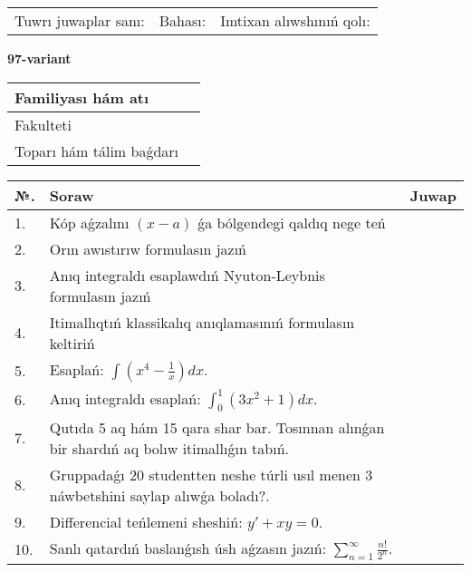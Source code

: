 \documentclass{article}
\begin{document}
\vspace{1cm}

\begin{tabular}{ c c c }
Tuwrı juwaplar sanı: \underline{\hspace{2cm}} & Bahası: \underline{\hspace{2cm}} & Imtixan alıwshınıń qolı: \underline{\hspace{2cm}} \\
\end{tabular}

\newpage

\begin{center}\textbf{97-variant}\end{center}

\bgroup
\def\arraystretch{1.5}
\begin{tabular}{ |m{6cm}|m{10cm}| }
  \hline
  Familiyası hám atı & \\
  \hline
  Fakulteti &\\
  \hline
  Toparı hám tálim baǵdarı & \\
  \hline
\end{tabular}
\egroup

\vspace{0.5cm}

\bgroup
\def\arraystretch{2}
\begin{tabular}{ |l|m{8cm}|m{7cm}| }
  \hline
  №. & Soraw & Juwap \\
  \hline
  1. & Kóp aǵzalını $(x - a)$ ǵa bólgendegi qaldıq nege teń &  \\
  \hline
  2. & Orın awıstırıw formulasın jazıń &  \\
  \hline
  3. & Anıq integraldı esaplawdıń Nyuton-Leybnis formulasın jazıń &  \\
  \hline
  4. & Itimallıqtıń klassikalıq anıqlamasınıń formulasın keltiriń &  \\
  \hline
  5. & Esaplań: $\displaystyle\int \left( x^{4}-\frac{1}{x} \right)dx$. &  \\
  \hline
  6. & Anıq integraldı esaplań: $\displaystyle\int_{0}^{1}{(3x^{2} + 1)dx}$. &  \\
  \hline
  7. & Qutıda 5 aq hám 15 qara shar bar. Tosınnan alınǵan bir shardıń aq bolıw itimallıǵın tabıń. &  \\
  \hline
  8. & Gruppadaǵı 20 studentten neshe túrli usıl menen 3 náwbetshini saylap alıwǵa boladı?. &  \\
  \hline
  9. & Differencial teńlemeni sheshiń: $y' + xy = 0$. &  \\
  \hline
  10. & Sanlı qatardıń baslanǵısh úsh aǵzasın jazıń: $\displaystyle\sum_{n = 1}^{\infty}\frac{n!}{2^{n}}$. &  \\
  \hline
\end{tabular}
\egroup
\end{document}
